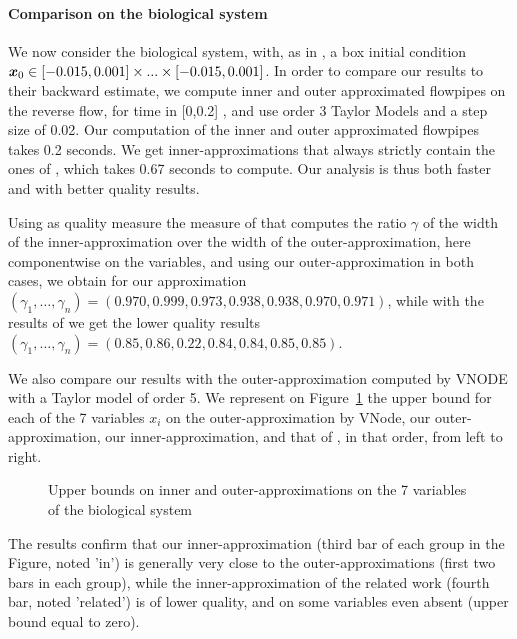 \documentclass{sig-alternate-05-2015}
\begin{document}
\paragraph{Comparison on the biological system}
We now consider the biological system, with, as in \cite{underapprox16}, a box initial condition $\x_0 \in [-0.015,0.001] \times...\times [-0.015,0.001]$. 
In order to compare our results to their backward estimate, we compute inner and outer approximated flowpipes on the reverse flow, 
for time in [0,0.2] , and use order 3 Taylor Models and a step size of 0.02. Our computation of the inner and outer approximated flowpipes takes 0.2 seconds. 
We get inner-approximations that always strictly contain the  ones of \cite{underapprox16}, which takes 0.67 seconds to compute. Our analysis is thus both 
faster and with better quality results. 

Using as quality measure the measure of  \cite{Underapproxflowpipes} that computes the ratio $\gamma$ of the width of the inner-approximation over the width of the outer-approximation, 
here componentwise on the variables, and using our outer-approximation in both cases, we obtain for our approximation
$(\gamma_1,\ldots,\gamma_n)=(0.970,   0.999,   0.973,   0.938,   0.938,   0.970,   0.971)$, 
while with the results of \cite{underapprox16} we get the lower quality results
$(\gamma_1,\ldots,\gamma_n)=( 0.85,   0.86,   0.22,   0.84 ,  0.84 ,  0.85,   0.85)$.

We also compare our results with the outer-approximation computed by VNODE with a Taylor model of order 5. 
We represent on Figure~\ref{fig:histo} the upper bound for each of the 7 variables $x_i$ on the outer-approximation by VNode,  
our outer-approximation, our inner-approximation, and that of \cite{underapprox16}, in that order, from left to right.
\begin{figure}[htbp]
\begin{center}
\end{center}
\caption{Upper bounds on inner and outer-approximations on the 7 variables of the biological system \label{fig:histo}}
\end{figure}
The results confirm that our inner-approximation (third bar of each group in the Figure, noted 'in') is generally very close to the outer-approximations (first two bars in each group),
while the inner-approximation of the related work (fourth bar, noted 'related') is of lower quality, and on some variables even absent (upper bound equal to zero).
\end{document}
